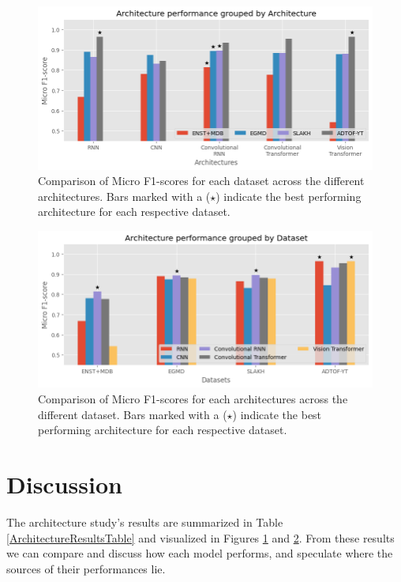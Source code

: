 \begin{figure}[H]
    \centering
    \hspace*{-0.8cm}
    \includegraphics[scale=0.8]{figures/architectureperformancearchitecture.png}
    \caption{Comparison of Micro F1-scores for each dataset across the different architectures. Bars marked with a ($\star$) indicate the best performing architecture for each respective dataset.}
    \label{ArchitectureResultsArchitectureFigure}
\end{figure}

\begin{figure}[H]
    \centering
    \hspace*{-0.8cm}
    \includegraphics[scale=0.8]{figures/architectureperformancedataset.png}
    \caption{Comparison of Micro F1-scores for each architectures across the different dataset. Bars marked with a ($\star$) indicate the best performing architecture for each respective dataset.}
    \label{ArchitectureResultsDatasetFigure}
\end{figure}

\section{Discussion}

The architecture study's results are summarized in Table \ref{ArchitectureResultsTable} and visualized in Figures \ref{ArchitectureResultsArchitectureFigure} and \ref{ArchitectureResultsDatasetFigure}. From these results we can compare and discuss how each model performs, and speculate where the sources of their performances lie.

